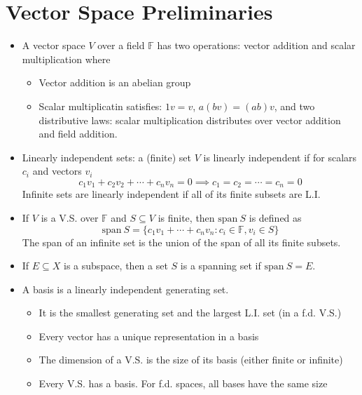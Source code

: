 \documentclass{article}
\theoremstyle{plain}
\theoremstyle{definition}
\begin{document}
		\section{Vector Space Preliminaries}
		\begin{itemize}
				\item A vector space $V$ over a field $\mathbb{F}$ has two operations: vector addition and scalar multiplication where 
						\begin{itemize}
								\item Vector addition is an abelian group 
								\item Scalar multiplicatin satisfies: $1v = v$, $a(bv) = (ab)v$, and two distributive laws: scalar multiplication distributes over vector addition and field addition. 
						\end{itemize}

				\item Linearly independent sets: a (finite) set $V$ is linearly independent if for scalars $c_i$ and vectors $v_i$ 
						\begin{equation*}
								c_1v_1 + c_2v_2 + \cdots + c_nv_n = 0 \implies c_1 = c_2 = \cdots = c_n = 0
						\end{equation*}
						Infinite sets are linearly independent if all of its finite subsets are L.I. 

				\item If $V$ is a V.S. over $\mathbb{F}$ and $S \subseteq V$ is finite, then $\mathrm{span}\ S$ is defined as 
						\begin{equation*}
								\mathrm{span}\ S = \{c_1v_1 + \cdots + c_nv_n : c_i \in \mathbb{F}, v_i \in S\}
						\end{equation*}
						The span of an infinite set is the union of the span of all its finite subsets. 

				\item If $E \subseteq X$ is a subspace, then a set $S$ is a spanning set if $\mathrm{span}\ S = E$. 

				\item A basis is a linearly independent generating set. 
						\begin{itemize}
								\item It is the smallest generating set and the largest L.I. set (in a f.d. V.S.) 
								\item Every vector has a unique representation in a basis
								\item The dimension of a V.S. is the size of its basis (either finite or infinite)
								\item Every V.S. has a basis. For f.d. spaces, all bases have the same size 
						\end{itemize}
		\end{itemize}
\end{document}
